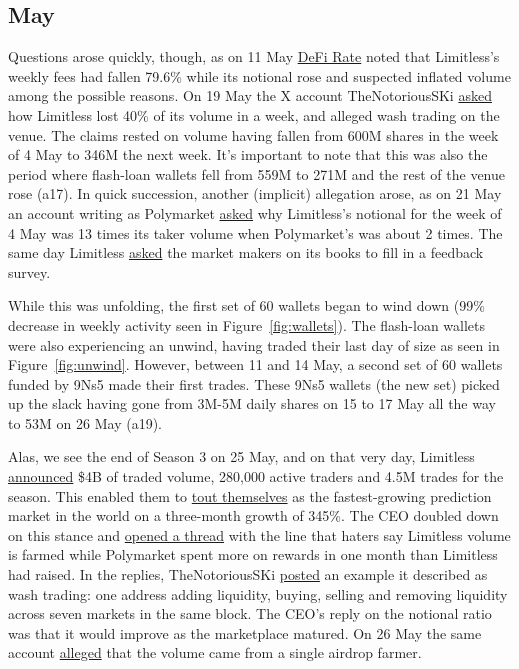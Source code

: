 \documentclass[11pt]{article}
\begin{document}
\subsection{May}

Questions arose quickly, though, as on 11 May \href{https://defirate.com/news/kalshi-sets-weekly-high-4-1b-volume-polymarket-slides/}{DeFi Rate} noted that Limitless's weekly fees had fallen 79.6\% while its notional rose and suspected inflated volume among the possible reasons.
On 19 May the X account TheNotoriousSKi \href{https://x.com/TheNotoriousSKi/status/2056862335927722348}{asked} how Limitless lost 40\% of its volume in a week, and alleged wash trading on the venue.
The claims rested on volume having fallen from 600M shares in the week of 4 May to 346M the next week.
It's important to note that this was also the period where flash-loan wallets fell from 559M to 271M and the rest of the venue rose (a17).
In quick succession, another (implicit) allegation arose, as on 21 May an account writing as Polymarket \href{https://x.com/primo_data/status/2057529381325820245}{asked} why Limitless's notional for the week of 4 May was 13 times its taker volume when Polymarket's was about 2 times.
The same day Limitless \href{https://x.com/trylimitless/status/2057400331428900947}{asked} the market makers on its books to fill in a feedback survey.

While this was unfolding, the first set of 60 wallets began to wind down (99\% decrease in weekly activity seen in Figure~\ref{fig:wallets}).
The flash-loan wallets were also experiencing an unwind, having traded their last day of size as seen in Figure~\ref{fig:unwind}.
However, between 11 and 14 May, a second set of 60 wallets funded by 9Ns5 made their first trades.
These 9Ns5 wallets (the new set) picked up the slack having gone from 3M-5M daily shares on 15 to 17 May all the way to 53M on 26 May (a19).

Alas, we see the end of Season 3 on 25 May, and on that very day, Limitless \href{https://x.com/trylimitless/status/2059026219593544133}{announced} \$4B of traded volume, 280,000 active traders and 4.5M trades for the season.
This enabled them to \href{https://x.com/trylimitless/status/2058931786881622504}{tout themselves} as the fastest-growing prediction market in the world on a three-month growth of 345\%.
The CEO doubled down on this stance and \href{https://x.com/cjhtech/status/2058952687668904218}{opened a thread} with the line that haters say Limitless volume is farmed while Polymarket spent more on rewards in one month than Limitless had raised.
In the replies, TheNotoriousSKi \href{https://x.com/TheNotoriousSKi/status/2059055361714454618}{posted} an example it described as wash trading: one address adding liquidity, buying, selling and removing liquidity across seven markets in the same block.
The CEO's reply on the notional ratio was that it would improve as the marketplace matured.
On 26 May the same account \href{https://x.com/TheNotoriousSKi/status/2059085342222020849}{alleged} that the volume came from a single airdrop farmer.
\end{document}
